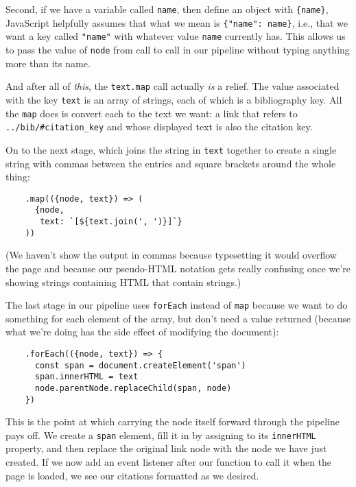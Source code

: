 Second,
if we have a variable called \texttt{name},
then define an object with \texttt{\{name\}},
JavaScript helpfully assumes that what we mean is \texttt{\{"name":\ name\}},
i.e.,
that we want a key called \texttt{"name"}
with whatever value \texttt{name} currently has.
This allows us to pass the value of \texttt{node} from call to call in our pipeline
without typing anything more than its name.

And after all of \emph{this},
the \texttt{text.map} call actually \emph{is} a relief.
The value associated with the key \texttt{text} is an array of strings,
each of which is a bibliography key.
All the \texttt{map} does is convert each to the text we want:
a link that refers to \texttt{../bib/\#citation\_key} and whose displayed text is also the citation key.

On to the next stage,
which joins the string in \texttt{text} together to create a single string
with commas between the entries
and square brackets around the whole thing:

\begin{verbatim}
    .map(({node, text}) => (
      {node,
       text: `[${text.join(', ')}]`}
    ))
\end{verbatim}

\noindent
(We haven't show the output in commas because typesetting it would overflow the page
and because our pseudo-HTML notation gets really confusing
once we're showing strings containing HTML that contain strings.)

The last stage in our pipeline uses \texttt{forEach} instead of \texttt{map}
because we want to do something for each element of the array,
but don't need a value returned
(because what we're doing has the side effect of modifying the document):

\begin{verbatim}
    .forEach(({node, text}) => {
      const span = document.createElement('span')
      span.innerHTML = text
      node.parentNode.replaceChild(span, node)
    })
\end{verbatim}

This is the point at which carrying the node itself forward through the pipeline pays off.
We create a \texttt{span} element,
fill it in by assigning to its \texttt{innerHTML} property,
and then replace the original link node with the node we have just created.
If we now add an event listener after our function to call it when the page is loaded,
we see our citations formatted as we desired.

